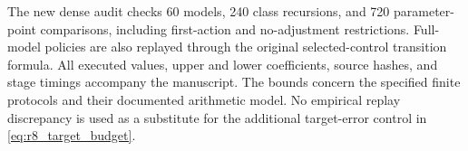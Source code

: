 The new dense audit checks 60 models, 240 class recursions, and 720 parameter-point comparisons, including first-action and no-adjustment restrictions. Full-model policies are also replayed through the original selected-control transition formula. All executed values, upper and lower coefficients, source hashes, and stage timings accompany the manuscript. The bounds concern the specified finite protocols and their documented arithmetic model. No empirical replay discrepancy is used as a substitute for the additional target-error control in \eqref{eq:r8_target_budget}.
